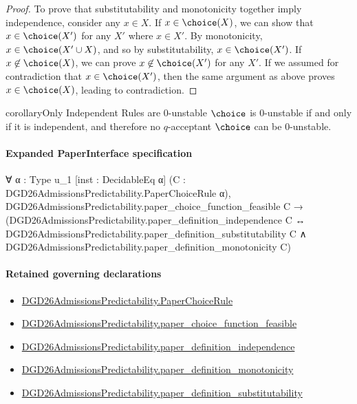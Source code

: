 \documentclass[10pt]{article}
\begin{document}
\begin{ReviewVerbatim}
\begin{proof}
    To prove that substitutability and monotonicity together imply independence, consider any $x \in X$. If $x \in \choice(X)$, we can show that $x \in \choice(X')$ for any $X'$ where $x \in X'$. By monotonicity, $x \in \choice(X' \cup X)$, and so by substitutability, $x \in \choice(X')$. If $x \not\in \choice(X)$, we can prove $x \not\in \choice(X')$ for any $X'$. If we assumed for contradiction that $x \in \choice(X')$, then the same argument as above proves $x \in \choice(X)$, leading to contradiction.
\end{proof}

\begin{restatable}{corollary}{Only Independent Rules are 0-unstable}
\label{thm:independent-zero-unstable}
$\choice$ is $0$-unstable if and only if it is independent, and therefore no $q$-acceptant $\choice$ can be $0$-unstable.
\end{restatable}
\end{ReviewVerbatim}



\paragraph{Expanded PaperInterface specification}
\begin{ReviewVerbatim}
∀ {α : Type u_1} [inst : DecidableEq α] (C : DGD26AdmissionsPredictability.PaperChoiceRule α),
  DGD26AdmissionsPredictability.paper_choice_function_feasible C →
    (DGD26AdmissionsPredictability.paper_definition_independence C ↔
      DGD26AdmissionsPredictability.paper_definition_substitutability C ∧
        DGD26AdmissionsPredictability.paper_definition_monotonicity C)
\end{ReviewVerbatim}

\paragraph{Retained governing declarations}
\begin{itemize}\raggedright
\item \hyperlink{governing-declaration-4678951b4432b184}{DGD26\allowbreak{}Admissions\allowbreak{}Predictability.\allowbreak{}Paper\allowbreak{}Choice\allowbreak{}Rule}
\item \hyperlink{governing-declaration-f7de74a44053f6d5}{DGD26\allowbreak{}Admissions\allowbreak{}Predictability.\allowbreak{}paper\_\allowbreak{}choice\_\allowbreak{}function\_\allowbreak{}feasible}
\item \hyperlink{governing-declaration-707bee77009ecc4d}{DGD26\allowbreak{}Admissions\allowbreak{}Predictability.\allowbreak{}paper\_\allowbreak{}definition\_\allowbreak{}independence}
\item \hyperlink{governing-declaration-bac62f3daf5d4d98}{DGD26\allowbreak{}Admissions\allowbreak{}Predictability.\allowbreak{}paper\_\allowbreak{}definition\_\allowbreak{}monotonicity}
\item \hyperlink{governing-declaration-39cdd64a379d386b}{DGD26\allowbreak{}Admissions\allowbreak{}Predictability.\allowbreak{}paper\_\allowbreak{}definition\_\allowbreak{}substitutability}
\end{itemize}
\end{document}
